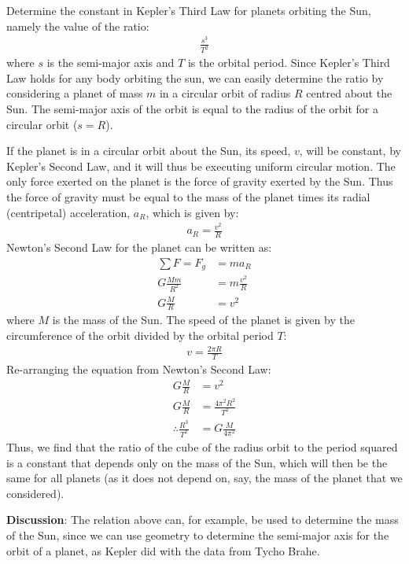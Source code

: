\begin{example}{\label{ex:gravity:keplerconstant}Determine the constant in Kepler's Third Law for planets orbiting the Sun, namely the value of the ratio:
\begin{align*}
\frac{s^3}{T^2}
\end{align*}
where $s$ is the semi-major axis and $T$ is the orbital period.
}
Since Kepler's Third Law holds for any body orbiting the sun, we can easily determine the ratio by considering a planet of mass $m$ in a circular orbit of radius $R$ centred about the Sun. The semi-major axis of the orbit is equal to the radius of the orbit for a circular orbit ($s=R$).

If the planet is in a circular orbit about the Sun, its speed, $v$, will be constant, by Kepler's Second Law, and it will thus be executing uniform circular motion. The only force exerted on the planet is the force of gravity exerted by the Sun. Thus the force of gravity must be equal to the mass of the planet times its radial (centripetal) acceleration, $a_R$, which is given by:
\begin{align*}
a_R=\frac{v^2}{R}
\end{align*}
Newton's Second Law for the planet can be written as:
\begin{align*}
\sum F = F_g &= ma_R\\
G\frac{Mm}{R^2}&=m\frac{v^2}{R}\\
G\frac{M}{R}&=v^2
\end{align*}
where $M$ is the mass of the Sun. The speed of the planet is given by the circumference of the orbit divided by the orbital period $T$:
\begin{align*}
v=\frac{2\pi R}{T}
\end{align*}
Re-arranging the equation from Newton's Second Law:
\begin{align*}
G\frac{M}{R}&=v^2\\
G\frac{M}{R}&=\frac{4\pi^2 R^2}{T^2}\\
\therefore \frac{R^3}{T^2}&=G\frac{M}{4\pi^2}
\end{align*}
Thus, we find that the ratio of the cube of the radius orbit to the period squared is a constant that depends only on the mass of the Sun, which will then be the same for all planets (as it does not depend on, say, the mass of the planet that we considered).

\textbf{Discussion}: The relation above can, for example, be used to determine the mass of the Sun, since we can use geometry to determine the semi-major axis for the orbit of a planet, as Kepler did with the data from Tycho Brahe.
\end{example}

